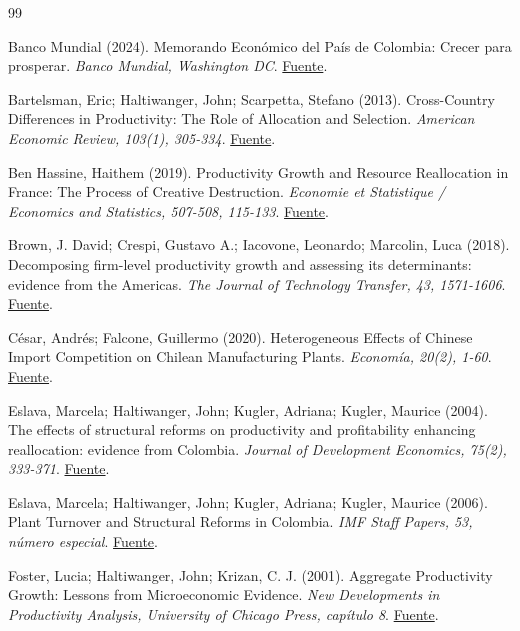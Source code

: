 \begin{thebibliography}{99}

 Banco Mundial (2024). Memorando Económico del País de Colombia: Crecer para prosperar. \emph{Banco Mundial, Washington DC}. \href{https://documents1.worldbank.org/curated/en/099042525165519971/pdf/P177730-ca16ae09-fb9a-4f6a-a7f4-b88f1347d370.pdf}{Fuente}.

 Bartelsman, Eric; Haltiwanger, John; Scarpetta, Stefano (2013). Cross-Country Differences in Productivity: The Role of Allocation and Selection. \emph{American Economic Review, 103(1), 305-334}. \href{https://www.aeaweb.org/articles?id=10.1257/aer.103.1.305}{Fuente}.

 Ben Hassine, Haithem (2019). Productivity Growth and Resource Reallocation in France: The Process of Creative Destruction. \emph{Economie et Statistique / Economics and Statistics, 507-508, 115-133}. \href{https://doi.org/10.24187/ecostat.2019.507d.1979}{Fuente}.

 Brown, J. David; Crespi, Gustavo A.; Iacovone, Leonardo; Marcolin, Luca (2018). Decomposing firm-level productivity growth and assessing its determinants: evidence from the Americas. \emph{The Journal of Technology Transfer, 43, 1571-1606}. \href{https://doi.org/10.1007/s10961-018-9678-0}{Fuente}.

 César, Andrés; Falcone, Guillermo (2020). Heterogeneous Effects of Chinese Import Competition on Chilean Manufacturing Plants. \emph{Economía, 20(2), 1-60}. \href{https://www.jstor.org/stable/27007012}{Fuente}.

 Eslava, Marcela; Haltiwanger, John; Kugler, Adriana; Kugler, Maurice (2004). The effects of structural reforms on productivity and profitability enhancing reallocation: evidence from Colombia. \emph{Journal of Development Economics, 75(2), 333-371}. \href{https://www.nber.org/papers/w10367}{Fuente}.

 Eslava, Marcela; Haltiwanger, John; Kugler, Adriana; Kugler, Maurice (2006). Plant Turnover and Structural Reforms in Colombia. \emph{IMF Staff Papers, 53, número especial}. \href{https://www.imf.org/external/pubs/ft/staffp/2006/03/eslava.htm}{Fuente}.

 Foster, Lucia; Haltiwanger, John; Krizan, C. J. (2001). Aggregate Productivity Growth: Lessons from Microeconomic Evidence. \emph{New Developments in Productivity Analysis, University of Chicago Press, capítulo 8}. \href{https://www.nber.org/books-and-chapters/new-developments-productivity-analysis/aggregate-productivity-growth-lessons-microeconomic-evidence}{Fuente}.


\end{thebibliography}
